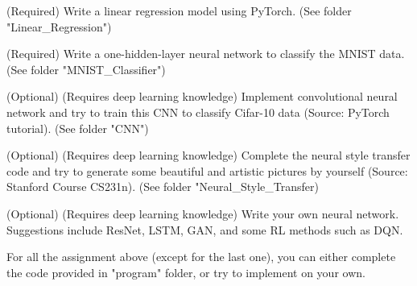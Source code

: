 \documentclass[english]{../TeXTemplate/pkupaper}
\begin{document}
\begin{partlist}
\item (Required) Write a linear regression model using PyTorch. (See folder "Linear\_Regression")
\item (Required) Write a one-hidden-layer neural network to classify the MNIST data. (See folder "MNIST\_Classifier")
\item (Optional) (Requires deep learning knowledge) Implement convolutional neural network and try to train this CNN to classify Cifar-10 data (Source: PyTorch tutorial). (See folder "CNN")
\item (Optional) (Requires deep learning knowledge) Complete the neural style transfer code and try to generate some beautiful and artistic pictures by yourself (Source: Stanford Course CS231n). (See folder "Neural\_Style\_Transfer)
\item (Optional) (Requires deep learning knowledge) Write your own neural network. Suggestions include ResNet, LSTM, GAN, and some RL methods such as DQN.
\end{partlist}

\par For all the assignment above (except for the last one), you can either complete the code provided in "program" folder, or try to implement on your own.
\end{document}
